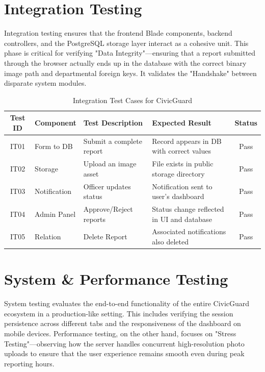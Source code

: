 \section{Integration Testing}
Integration testing ensures that the frontend Blade components, backend controllers, and the PostgreSQL storage layer interact as a cohesive unit. This phase is critical for verifying "Data Integrity"—ensuring that a report submitted through the browser actually ends up in the database with the correct binary image path and departmental foreign keys. It validates the "Handshake" between disparate system modules.

\begin{table}[H]
    \centering
    \renewcommand{\arraystretch}{1.3}
    \small
    \begin{tabular}{|c|p{3.5cm}|p{3.5cm}|p{3.5cm}|c|}
        \hline
        \textbf{Test ID} & \textbf{Component} & \textbf{Test Description} & \textbf{Expected Result} & \textbf{Status} \\
        \hline
        IT01 & Form to DB & Submit a complete report & Record appears in DB with correct values & Pass \\
        \hline
        IT02 & Storage & Upload an image asset & File exists in public storage directory & Pass \\
        \hline
        IT03 & Notification & Officer updates status & Notification sent to user's dashboard & Pass \\
        \hline
        IT04 & Admin Panel & Approve/Reject reports & Status change reflected in UI and database & Pass \\
        \hline
        IT05 & Relation & Delete Report & Associated notifications also deleted & Pass \\
        \hline
    \end{tabular}
    \caption{Integration Test Cases for CivicGuard}
\end{table}

\section{System \& Performance Testing}
System testing evaluates the end-to-end functionality of the entire CivicGuard ecosystem in a production-like setting. This includes verifying the session persistence across different tabs and the responsiveness of the dashboard on mobile devices. Performance testing, on the other hand, focuses on "Stress Testing"—observing how the server handles concurrent high-resolution photo uploads to ensure that the user experience remains smooth even during peak reporting hours.

